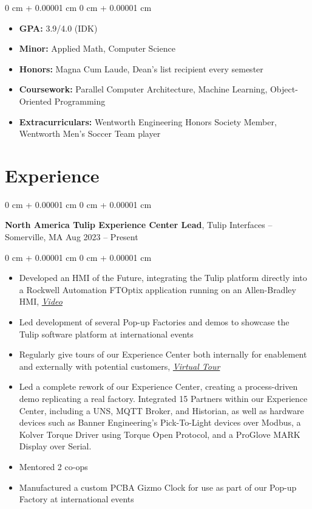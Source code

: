 \documentclass[10pt, letterpaper]{article}
\newenvironment{highlights}{
    \begin{itemize}[
        topsep=0.10 cm,
        parsep=0.10 cm,
        partopsep=0pt,
        itemsep=0pt,
        leftmargin=0 cm + 10pt
    ]
}{
    \end{itemize}
} %
\newenvironment{onecolentry}{
    \begin{adjustwidth}{
        0 cm + 0.00001 cm
    }{
        0 cm + 0.00001 cm
    }
}{
    \end{adjustwidth}
} %
\newenvironment{twocolentry}[2][]{
    \onecolentry
    \def\secondColumn{#2}
    \setcolumnwidth{\fill, 4.5 cm}
    \begin{paracol}{2}
}{
    \switchcolumn \raggedleft \secondColumn
    \end{paracol}
    \endonecolentry
} %
\begin{document}
        \vspace{0.10 cm}
        \begin{onecolentry}
            \begin{highlights}
                \item  \textbf{GPA:} 3.9/4.0 (IDK)
                \item  \textbf{Minor:} Applied Math, Computer Science
                \item  \textbf{Honors:} Magna Cum Laude, Dean's list recipient every semester
                 \item \textbf{Coursework:} Parallel Computer Architecture, Machine Learning, Object-Oriented Programming
                \item  \textbf{Extracurriculars:} Wentworth Engineering Honors Society Member, Wentworth Men's Soccer Team player
            \end{highlights}
        \end{onecolentry}


    \section{Experience}
        \begin{twocolentry}{
            Aug 2023 – Present
        }
            \textbf{North America Tulip Experience Center Lead}, Tulip Interfaces -- Somerville, MA\end{twocolentry}

        \vspace{0.10 cm}
        \begin{onecolentry}
            \begin{highlights}
                \item Developed an HMI of the Future, integrating the Tulip platform directly into a Rockwell Automation FTOptix application running on an Allen-Bradley HMI, \textit{\href{https://youtu.be/9DY1roc3KkQ?feature=shared}{Video}}
                \item Led development of several Pop-up Factories and demos to showcase the Tulip software platform at international events
                \item Regularly give tours of our Experience Center both internally for enablement and externally with potential customers, \textit{\href{https://tulip.co/tec-virtual-tour}{Virtual Tour}}
                \item Led a complete rework of our Experience Center, creating a process-driven demo replicating a real factory. Integrated 15 Partners within our Experience Center, including a UNS, MQTT Broker, and Historian, as well as hardware devices such as Banner Engineering's Pick-To-Light devices over Modbus, a Kolver Torque Driver using Torque Open Protocol, and a ProGlove MARK Display over Serial.
                \item Mentored 2 co-ops
                \item Manufactured a custom PCBA Gizmo Clock for use as part of our Pop-up Factory at international events
            \end{highlights}
        \end{onecolentry}
\end{document}
